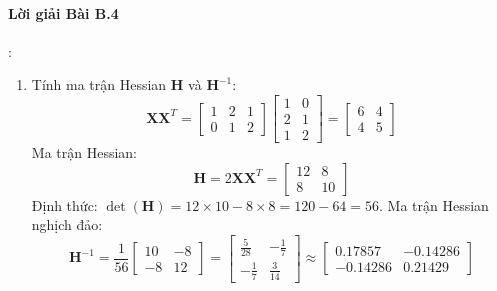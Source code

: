 \paragraph{Lời giải Bài B.4}:
\begin{enumerate}
  \item Tính ma trận Hessian $\mathbf{H}$ và $\mathbf{H}^{-1}$:
  \begin{equation*}
  \mathbf{X} \mathbf{X}^T = \begin{bmatrix} 1 & 2 & 1 \\ 0 & 1 & 2 \end{bmatrix} \begin{bmatrix} 1 & 0 \\ 2 & 1 \\ 1 & 2 \end{bmatrix} = \begin{bmatrix} 6 & 4 \\ 4 & 5 \end{bmatrix}
  \end{equation*}
  Ma trận Hessian:
  \begin{equation*}
  \mathbf{H} = 2 \mathbf{X} \mathbf{X}^T = \begin{bmatrix} 12 & 8 \\ 8 & 10 \end{bmatrix}
  \end{equation*}
  Định thức: $\det(\mathbf{H}) = 12 \times 10 - 8 \times 8 = 120 - 64 = 56$.
  Ma trận Hessian nghịch đảo:
  \begin{equation*}
  \mathbf{H}^{-1} = \frac{1}{56} \begin{bmatrix} 10 & -8 \\ -8 & 12 \end{bmatrix} = \begin{bmatrix} \frac{5}{28} & -\frac{1}{7} \\ -\frac{1}{7} & \frac{3}{14} \end{bmatrix} \approx \begin{bmatrix} 0.17857 & -0.14286 \\ -0.14286 & 0.21429 \end{bmatrix}
  \end{equation*}


\end{enumerate}
